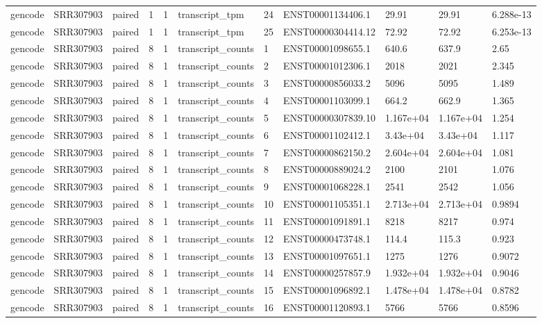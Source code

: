 \begin{tabular}{lllllllllll}
gencode & SRR307903 & paired & 1 & 1 & transcript\_tpm & 24 & ENST00001134406.1 & 29.91 & 29.91 & 6.288e-13 \\
gencode & SRR307903 & paired & 1 & 1 & transcript\_tpm & 25 & ENST00000304414.12 & 72.92 & 72.92 & 6.253e-13 \\
gencode & SRR307903 & paired & 8 & 1 & transcript\_counts & 1 & ENST00001098655.1 & 640.6 & 637.9 & 2.65 \\
gencode & SRR307903 & paired & 8 & 1 & transcript\_counts & 2 & ENST00001012306.1 & 2018 & 2021 & 2.345 \\
gencode & SRR307903 & paired & 8 & 1 & transcript\_counts & 3 & ENST00000856033.2 & 5096 & 5095 & 1.489 \\
gencode & SRR307903 & paired & 8 & 1 & transcript\_counts & 4 & ENST00001103099.1 & 664.2 & 662.9 & 1.365 \\
gencode & SRR307903 & paired & 8 & 1 & transcript\_counts & 5 & ENST00000307839.10 & 1.167e+04 & 1.167e+04 & 1.254 \\
gencode & SRR307903 & paired & 8 & 1 & transcript\_counts & 6 & ENST00001102412.1 & 3.43e+04 & 3.43e+04 & 1.117 \\
gencode & SRR307903 & paired & 8 & 1 & transcript\_counts & 7 & ENST00000862150.2 & 2.604e+04 & 2.604e+04 & 1.081 \\
gencode & SRR307903 & paired & 8 & 1 & transcript\_counts & 8 & ENST00000889024.2 & 2100 & 2101 & 1.076 \\
gencode & SRR307903 & paired & 8 & 1 & transcript\_counts & 9 & ENST00001068228.1 & 2541 & 2542 & 1.056 \\
gencode & SRR307903 & paired & 8 & 1 & transcript\_counts & 10 & ENST00001105351.1 & 2.713e+04 & 2.713e+04 & 0.9894 \\
gencode & SRR307903 & paired & 8 & 1 & transcript\_counts & 11 & ENST00001091891.1 & 8218 & 8217 & 0.974 \\
gencode & SRR307903 & paired & 8 & 1 & transcript\_counts & 12 & ENST00000473748.1 & 114.4 & 115.3 & 0.923 \\
gencode & SRR307903 & paired & 8 & 1 & transcript\_counts & 13 & ENST00001097651.1 & 1275 & 1276 & 0.9072 \\
gencode & SRR307903 & paired & 8 & 1 & transcript\_counts & 14 & ENST00000257857.9 & 1.932e+04 & 1.932e+04 & 0.9046 \\
gencode & SRR307903 & paired & 8 & 1 & transcript\_counts & 15 & ENST00001096892.1 & 1.478e+04 & 1.478e+04 & 0.8782 \\
gencode & SRR307903 & paired & 8 & 1 & transcript\_counts & 16 & ENST00001120893.1 & 5766 & 5766 & 0.8596 \\

\end{tabular}
